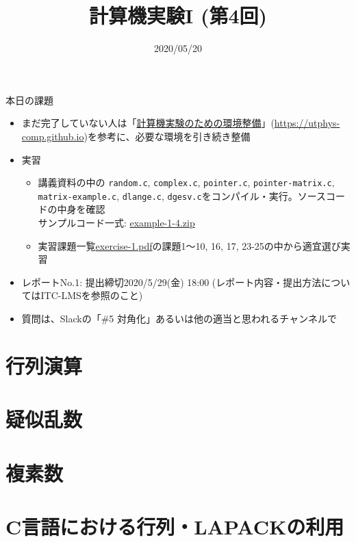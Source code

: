 \documentclass[10pt,dvipdfmx]{beamer}
\title{計算機実験I (第4回)}
\date{2020/05/20}
\begin{document}
\begin{frame}
  \titlepage
  \tableofcontents
\end{frame}

\begin{frame}[t]{本日の課題}
  \begin{itemize}
  \item まだ完了していない人は「\href{https://utphys-comp.github.io}{計算機実験のための環境整備}」({\small \href{https://utphys-comp.github.io}{https://utphys-comp.github.io}})を参考に、必要な環境を引き続き整備
  \item 実習
    \begin{itemize}
    \item 講義資料の中の {\tt random.c}, {\tt complex.c}, {\tt pointer.c}, {\tt pointer-matrix.c}, {\tt matrix-example.c}, {\tt dlange.c}, {\tt dgesv.c}をコンパイル・実行。ソースコードの中身を確認 \\
      サンプルコード一式: \href{https://github.com/todo-group/ComputerExperiments/releases/tag/2020s-computer1}{example-1-4.zip}
    \item 実習課題一覧\href{https://github.com/todo-group/ComputerExperiments/releases/tag/2020s-computer1}{exercise-1.pdf}の課題1〜10, 16, 17, 23-25の中から適宜選び実習
    \end{itemize}
  \item レポートNo.1: 提出締切2020/5/29(金) 18:00 (レポート内容・提出方法についてはITC-LMSを参照のこと)
  \item 質問は、Slackの「\#5 対角化」あるいは他の適当と思われるチャンネルで
  \end{itemize}
\end{frame}

\section{行列演算}


\section{疑似乱数}


\section{複素数}


\section{C言語における行列・LAPACKの利用}
\end{document}
